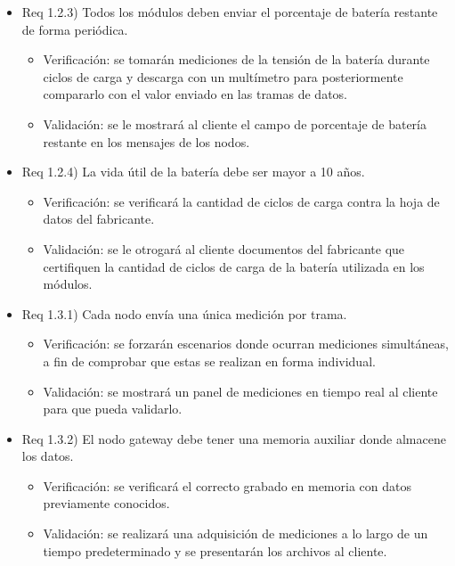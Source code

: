 \documentclass[
11pt, %
codirector, %
]{charter}
\begin{document}
\begin{itemize}
\item Req 1.2.3) Todos los módulos deben enviar el porcentaje de batería restante de forma periódica.

\begin{itemize}
	\item Verificación: se tomarán mediciones de la tensión de la batería durante ciclos de carga y descarga con un multímetro para posteriormente compararlo con el valor enviado en las tramas de datos. 
	\item Validación: se le mostrará al cliente el campo de porcentaje de batería restante en los mensajes de los nodos.
\end{itemize}

\item Req 1.2.4) La vida útil de la batería debe ser mayor a 10 años.

\begin{itemize}
	\item Verificación: se verificará la cantidad de ciclos de carga contra la hoja de datos del fabricante.
	\item Validación: se le otrogará al cliente documentos del fabricante que certifiquen la cantidad de ciclos de carga de la batería utilizada en los módulos.
\end{itemize}

\item Req 1.3.1) Cada nodo envía una única medición por trama.

\begin{itemize}
	\item Verificación: se forzarán escenarios donde ocurran mediciones simultáneas, a fin de comprobar que estas se realizan en forma individual.
	\item Validación: se mostrará un panel de mediciones en tiempo real al cliente para que pueda validarlo.
\end{itemize}

\item Req 1.3.2) El nodo gateway debe tener una memoria auxiliar donde almacene los datos.

\begin{itemize}
	\item Verificación: se verificará el correcto grabado en memoria con datos previamente conocidos.
	\item Validación: se realizará una adquisición de mediciones a lo largo de un tiempo predeterminado y se presentarán los archivos al cliente.
\end{itemize}


\end{itemize}
\end{document}
